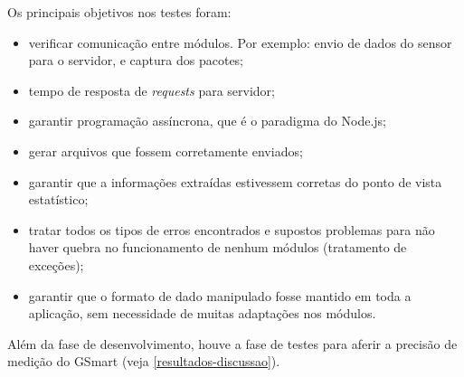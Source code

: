 Os principais objetivos nos testes foram:

\begin{itemize}
  \item verificar comunicação entre módulos. Por exemplo: envio de dados do sensor para o servidor, e captura dos pacotes;
  \item tempo de resposta de \emph{requests} para servidor;
  \item garantir programação assíncrona, que é o paradigma do Node.js;
  \item gerar arquivos que fossem corretamente enviados;
  \item garantir que a informações extraídas estivessem corretas do ponto de vista estatístico;
  \item tratar todos os tipos de erros encontrados e supostos problemas para não haver quebra no funcionamento de nenhum módulos (tratamento de exceções);
  \item garantir que o formato de dado manipulado fosse mantido em toda a aplicação, sem necessidade de muitas adaptações nos módulos.
\end{itemize}

Além da fase de desenvolvimento, houve a fase de testes para aferir a precisão de medição do GSmart (veja \autoref{resultados-discussao}).
